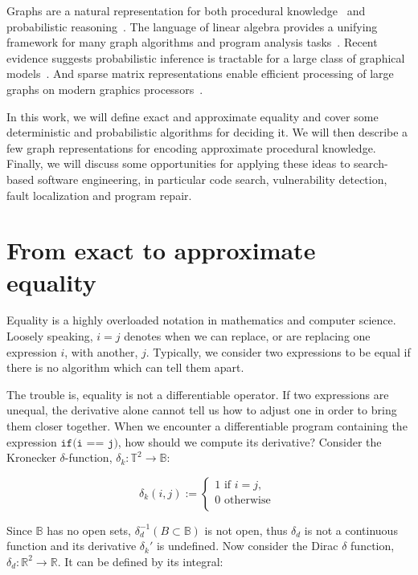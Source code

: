 \documentclass[11pt]{article}
\begin{document}
    Graphs are a natural representation for both procedural knowledge~\citep{allamanis2017learning} and probabilistic reasoning~\citep{pearl2014probabilistic}. The language of linear algebra provides a unifying framework for many graph algorithms and program analysis tasks~\citep{kepner2011graph}. Recent evidence suggests probabilistic inference is tractable for a large class of graphical models~\citep{choi2020probabilistic}. And sparse matrix representations enable efficient processing of large graphs on modern graphics processors~\citep{kepner2016mathematical}.

    In this work, we will define exact and approximate equality and cover some deterministic and probabilistic algorithms for deciding it. We will then describe a few graph representations for encoding approximate procedural knowledge. Finally, we will discuss some opportunities for applying these ideas to search-based software engineering, in particular code search, vulnerability detection, fault localization and program repair.

    \section{From exact to approximate equality}\label{sec:definitions}

    Equality is a highly overloaded notation in mathematics and computer science. Loosely speaking, $i = j$ denotes when we can replace, or are replacing one expression $i$, with another, $j$. Typically, we consider two expressions to be equal if there is no algorithm which can tell them apart.

    The trouble is, equality is not a differentiable operator. If two expressions are unequal, the derivative alone cannot tell us how to adjust one in order to bring them closer together. When we encounter a differentiable program containing the expression $\texttt{if(i == j)}$, how should we compute its derivative? Consider the Kronecker $\delta$-function, $\delta_k: \mathbb{T}^2\rightarrow \mathbb{B}$:

    $$
    \delta_k(i, j) :=
    \begin{cases}
        1 \text{ if } i = j, \\
        0 \text{ otherwise }\\
    \end{cases}
    $$

    Since $\mathbb{B}$ has no open sets, $\delta_d^{-1}(B\subset \mathbb{B})$ is not open, thus $\delta_d$ is not a continuous function and its derivative $\delta_k'$ is undefined. Now consider the Dirac $\delta$ function, $\delta_d: \mathbb{R}^2 \rightarrow \mathbb{R}$. It can be defined by its integral:
\end{document}
